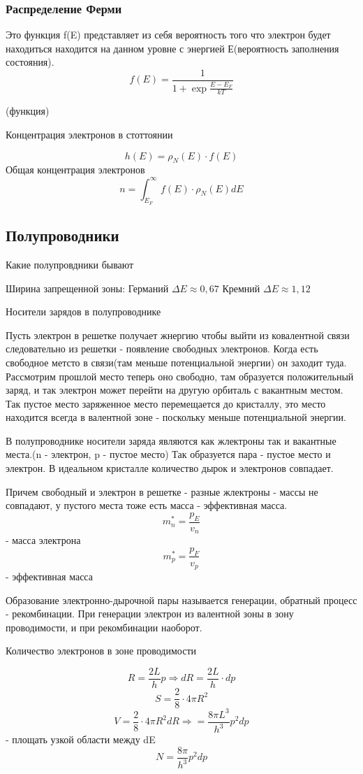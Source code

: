 \documentclass[../main.tex]{subfiles}
\begin{document}
\subsubsection{Распределение Ферми}
Это функция f(E) представляет из себя вероятность того что электрон будет находиться находится на данном уровне с энергией Е(вероятность заполнения состояния).
\[f(E) = \frac{1}{1 + \exp{\frac{E-E_F}{kT}}}\]

(функция)

Концентрация электронов в стоттоянии

\[h(E) = \rho_N(E) \cdot f(E)\]
Общая концентрация электронов
\[n = \int_{E_F}^{\infty} f(E) \cdot \rho_N(E) dE\]

\subsection{Полупроводники}
Какие полупровдники бывают

Ширина запрещенной зоны: Германий $\Delta E \approx 0,67$ Кремний $\Delta E \approx 1,12$

Носители зарядов в полупроводнике

Пусть электрон в решетке получает жнергию чтобы выйти из ковалентной связи следовательно из решетки - появление свободных электронов.
Когда есть свободное метсто в связи(там меньше потенциальной энергии) он заходит туда.
Рассмотрим прошлой место теперь оно свободно, там образуется положительный заряд, и так электрон может перейти на другую орбиталь с вакантным местом.
Так пустое место заряженное место перемещается до кристаллу, это место находится всегда в валентной зоне - поскольку меньше потенциальной энергии.

В полупроводнике носители заряда являются как жлектроны так и вакантные места.(n - электрон, p - пустое место)
Так образуется пара - пустое место и электрон. В идеальном кристалле количество дырок и электронов совпадает.

Причем свободный и электрон в решетке - разные жлектроны - массы не совпадают, у пустого места тоже есть масса - эффективная масса.
\[m^{*}_n = \frac{p_E}{v_n}\] - масса электрона
\[m^{*}_p = \frac{p_F}{v_p}\] - эффективная масса

Образование электронно-дырочной пары называется генерации, обратный процесс - рекомбинации. 
При генерации электрон из валентной зоны в зону проводимости, и при рекомбинации наоборот.

Количество электронов в зоне проводимости

\[R = \frac{2L}{h}p \Rightarrow dR = \frac{2L}{h}\cdot dp  \]
\[S = \frac{2}{8} \cdot 4 \pi R^2\]
\[V = \frac{2}{8} \cdot 4 \pi R^2 dR \Rightarrow = \frac{8 \pi L^3}{h^3} p^2 dp\] - площать узкой области между dE 
\[N = \frac{8 \pi}{h^3} p^2 dp\]
\end{document}
